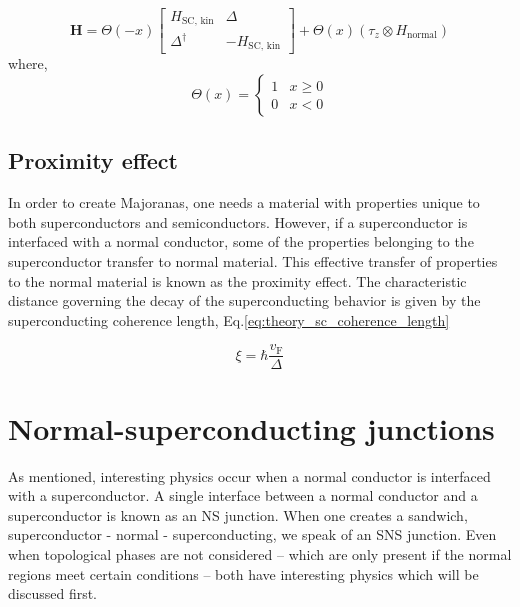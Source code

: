         \begin{equation}
            \mathbf{H} =  \Theta \left(-x\right) \begin{bmatrix} H_\text{SC, kin} & \Delta \\ \Delta^\dagger & -H_\text{SC, kin} \end{bmatrix} + \Theta \left(x\right)  \left( \tau_z \otimes H_\text{normal} \right) 
            \end{equation}
        where, 
        \begin{equation}
            \Theta(x) = \begin{cases} 1 & x \geq 0 \\ 0 & x < 0 \end{cases}
        \end{equation}


    \subsection{Proximity effect}
        In order to create Majoranas, one needs a material with properties unique to both superconductors and semiconductors.
        However, if a superconductor is interfaced with a normal conductor, some of the properties belonging to the superconductor transfer to normal material.
        This effective transfer of properties to the normal material is known as the proximity effect.
        The characteristic distance governing the decay of the superconducting behavior is given by the superconducting coherence length, Eq.\eqref{eq:theory_sc_coherence_length}
        
        \begin{equation}
            \xi = \hbar \frac{v_\text{F}}{\Delta}
            \label{eq:theory_sc_coherence_length}
        \end{equation}

\section{Normal-superconducting junctions}
    As mentioned, interesting physics occur when a normal conductor is interfaced with a superconductor.
    A single interface between a normal conductor and a superconductor is known as an NS junction.
    When one creates a sandwich, superconductor - normal - superconducting, we speak of an SNS junction.
    Even when topological phases are not considered -- which are only present if the normal regions meet certain conditions -- both have interesting physics which will be discussed first.


